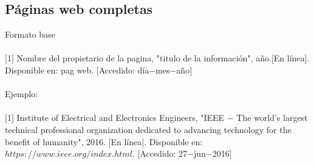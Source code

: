 \documentclass[10pt,letterpaper,twoside,twocolumn]{article}   %
\begin{document}
\subsection*{Páginas web completas}
Formato base\\
\\
$[$1$]$ Nombre del propietario de la pagina, "titulo de la información", año.$[$En línea$]$. Disponible en: pag web. $[$Accedido: día$-$mes$-$año$]$\\
\\
Ejemplo:\\
\\
$[$1$]$ Institute of Electrical and Electronics Engineers, "IEEE $-$ The world's largest technical professional organization dedicated to advancing technology for the benefit of humanity", 2016. $[$En línea$]$. Disponible en: $https://www.ieee.org/index.html.$ $[$Accedido: 27$-$jun$-$2016$]$



\end{document}
